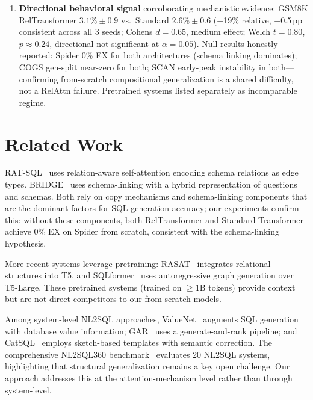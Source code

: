 \documentclass[conference]{IEEEtran}
\begin{document}
\begin{enumerate}[noitemsep,topsep=2pt]
  \item \textbf{Directional behavioral signal} corroborating mechanistic evidence: GSM8K RelTransformer $3.1\%{\pm}0.9$ vs.\ Standard $2.6\%{\pm}0.6$ ($+$19\% relative, $+$0.5\,pp consistent across all 3 seeds; Cohen\textquotesingle s $d{=}0.65$, medium effect; Welch $t{=}0.80$, $p{\approx}0.24$, directional not significant at $\alpha{=}0.05$). Null results honestly reported: Spider 0\% EX for both architectures (schema linking dominates); COGS gen-split near-zero for both; SCAN early-peak instability in both---confirming from-scratch compositional generalization is a shared difficulty, not a RelAttn failure. Pretrained systems listed separately as incomparable regime.
\end{enumerate}

\section{Related Work}
\label{sec:related}

RAT-SQL~\cite{wang2020ratsql} uses relation-aware self-attention encoding schema relations as edge types. BRIDGE~\cite{lin2020bridging} uses schema-linking with a hybrid representation of questions and schemas. Both rely on copy mechanisms and schema-linking components that are the dominant factors for SQL generation accuracy; our experiments confirm this: without these components, both RelTransformer and Standard Transformer achieve 0\% EX on Spider from scratch, consistent with the schema-linking hypothesis.

More recent systems leverage pretraining: RASAT~\cite{qi2022rasat} integrates relational structures into T5, and SQLformer~\cite{bazaga2023sqlformer} uses autoregressive graph generation over T5-Large. These pretrained systems (trained on $\geq$1B tokens) provide context but are not direct competitors to our from-scratch models.

Among system-level NL2SQL approaches, ValueNet~\cite{brunner2021valuenet} augments SQL
generation with database value information;
GAR~\cite{fan2023gar} uses a generate-and-rank pipeline; and CatSQL~\cite{fu2023catsql} employs sketch-based templates with semantic correction. The comprehensive NL2SQL360 benchmark~\cite{li2024nl2sql360} evaluates 20 NL2SQL systems, highlighting that structural generalization remains a key open challenge. Our approach addresses this at the attention-mechanism level rather than through system-level.
\end{document}
